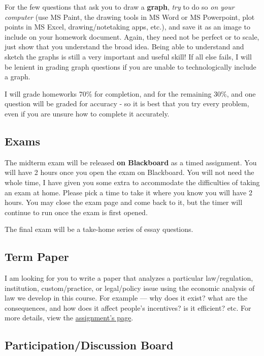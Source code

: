 \documentclass{article}
\begin{document}
For the few questions that ask you to draw a \textbf{graph}, \emph{try}
to do so \emph{on your computer} (use MS Paint, the drawing tools in MS
Word or MS Powerpoint, plot points in MS Excel, drawing/notetaking apps,
etc.), and save it as an image to include on your homework document.
Again, they need not be perfect or to scale, just show that you
understand the broad idea. Being able to understand and sketch the
graphs is still a very important and useful skill! If all else fails, I
will be lenient in grading graph questions if you are unable to
technologically include a graph.

I will grade homeworks 70\% for completion, and for the remaining 30\%,
and one question will be graded for accuracy - so it is best that you
try every problem, even if you are unsure how to complete it accurately.

\hypertarget{exams}{%
\subsection*{Exams}\label{exams}}

The midterm exam will be released \textbf{on Blackboard} as a timed
assignment. You will have 2 hours once you open the exam on Blackboard.
You will not need the whole time, I have given you some extra to
accommodate the difficulties of taking an exam at home. Please pick a
time to take it where you know you will have 2 hours. You may close the
exam page and come back to it, but the timer will continue to run once
the exam is first opened.

The final exam will be a take-home series of essay questions.

\hypertarget{term-paper}{%
\subsection*{Term Paper}\label{term-paper}}

I am looking for you to write a paper that analyzes a particular
law/regulation, institution, custom/practice, or legal/policy issue
using the economic analysis of law we develop in this course. For
example --- why does it exist? what are the consequences, and how does
it affect people's incentives? is it efficient? etc. For more details,
view the \href{assignment/paper}{assignment's page}.

\hypertarget{participationdiscussion-board}{%
\subsection*{Participation/Discussion
Board}\label{participationdiscussion-board}}
\end{document}
